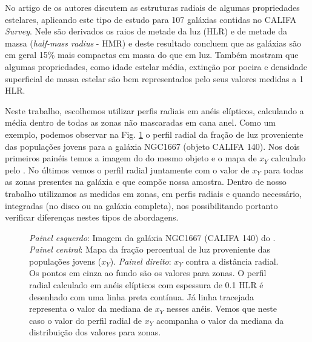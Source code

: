 No artigo de \citet{GonzalezDelgado.etal.2014a} os autores discutem as estruturas radiais de algumas
propriedades estelares, aplicando este tipo de estudo para 107 galáxias contidas no CALIFA {\em
Survey}. Nele são derivados os raios de metade da luz (HLR) e de metade da massa ({\em half-mass
radius} - HMR) e deste resultado concluem que as galáxias são em geral 15\% mais compactas em massa
do que em luz. Também mostram que algumas propriedades, como idade estelar média, extinção por
poeira e densidade superficial de massa estelar são bem representados pelo seus valores medidas a 1
HLR.

Neste trabalho, escolhemos utilizar perfis radiais em anéis elípticos, calculando a média dentro de
todas as zonas não mascaradas em cana anel. Como um exemplo, podemos observar na Fig.
\ref{fig:K0140xYRadProf} o perfil radial da fração de luz proveniente das populações jovens para a
galáxia NGC1667 (objeto CALIFA 140). Nos dois primeiros painéis temos a imagem do \SDSS do mesmo
objeto e o mapa de $x_Y$ calculado pelo \starlight. No últimos vemos o perfil radial juntamente com
o valor de $x_Y$ para todas as zonas presentes na galáxia e que compõe nossa amostra. Dentro de
nosso trabalho utilizamos as medidas em zonas, em perfis radiais e quando necessário, integradas (no
disco ou na galáxia completa), nos possibilitando portanto verificar diferenças nestes tipos de
abordagens.

\begin{figure}
	\centering
	\caption[Imagem e perfil radial de $x_Y$.]
	{\emph{Painel esquerdo}: Imagem da galáxia NGC1667 (CALIFA 140) do \SDSS. \emph{Painel central}:
	Mapa da fração percentual de luz proveniente das populações jovens ($x_Y$). \emph{Painel direito}:
	$x_Y$ contra a distância radial. Os pontos em cinza ao fundo são os valores para zonas. O perfil radial
	calculado em anéis elípticos com espessura de 0.1 HLR é desenhado com uma linha preta contínua.
	Já linha tracejada representa o valor da mediana de $x_Y$ nesses anéis. Vemos que neste caso o
	valor do perfil radial de $x_Y$ acompanha o valor da mediana da distribuição dos valores para
	zonas.}
	\label{fig:K0140xYRadProf}
\end{figure}
 
